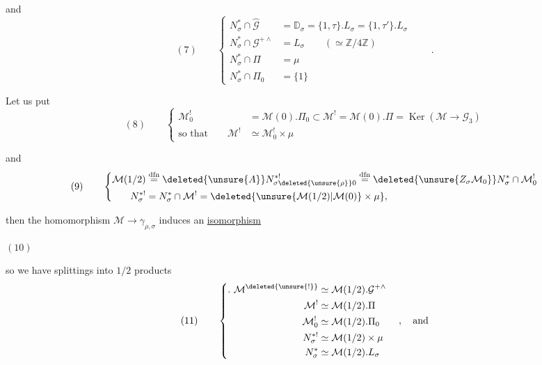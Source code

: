  and
\[
(7)\qquad
\left\{\begin{aligned}
N_\sigma^*\cap\widehat{\mathcal G}
  &=\mathbb D_\sigma=\{1,\tau\}.L_\sigma=\{1,\tau'\}.L_\sigma\\
N_\sigma^*\cap\mathcal G^{+\wedge}
  &= L_\sigma\qquad(\simeq\mathbb Z/4\mathbb Z)\\
N_\sigma^*\cap\Pi&=\mu\\
N_\sigma^*\cap\Pi_0&=\{1\}
\end{aligned}\right.
\qquad .
\]


Let us put
\[
(8)\qquad
\left\{\begin{aligned}
\mathcal M_0^!&=\mathcal M(0).\Pi_0
\subset\mathcal M^!=\mathcal M(0).\Pi
=\operatorname{Ker}(\mathcal M\to\mathcal G_3)\\
\text{so that}\qquad
\mathcal M^!&\simeq\mathcal M_0^!\times\mu
\end{aligned}\right.
\]

and
\[
(9)\qquad
\left\{\begin{aligned}
\mathcal M(1/2)
&\overset{\mathrm{dfn}}=
\deleted{\unsure{A}}N_{\sigma\deleted{\unsure{\rho}}0}^{*!}
\overset{\mathrm{dfn}}=
\deleted{\unsure{Z_\sigma\mathcal M_0}}N_\sigma^*\cap\mathcal M_0^!\\
N_\sigma^{*!}&=N_\sigma^*\cap\mathcal M^!
=\deleted{\unsure{\mathcal M(1/2)|\mathcal M(0)}\times\mu},
\end{aligned}\right.
\]

then the homomorphism  $\mathcal M\to\gamma_{\rho,\sigma}$
induces an \uline{isomorphism}

\begin{samepage}
\( (10) \)\quad
{}
\end{samepage}

so we have splittings into $1/2$  products
\[
(11)\qquad
\left\{\begin{aligned}
.\ \mathcal M^{\deleted{\unsure{!}}}
  &\simeq\mathcal M(1/2).\mathcal G^{+\wedge}\\
\mathcal M^!&\simeq\mathcal M(1/2).\Pi\\
\mathcal M_0^!&\simeq\mathcal M(1/2).\Pi_0\\
N_\sigma^{*!}&\simeq\mathcal M(1/2)\times\mu\\
N_\sigma^*&\simeq\mathcal M(1/2).L_\sigma
\end{aligned}\right.\quad,\quad\text{and}
\]

